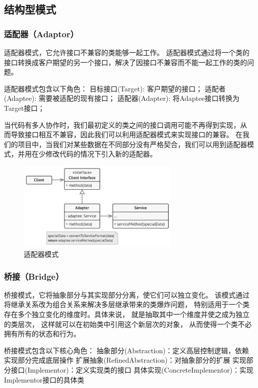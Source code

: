 \documentclass[12pt]{ctexart} %
\begin{document}
\subsection{结构型模式} 
\subsubsection{适配器（Adaptor）} 
适配器模式，它允许接口不兼容的类能够一起工作。
适配器模式通过将一个类的接口转换成客户期望的另一个接口，解决了因接口不兼容而不能一起工作的类的问题。

适配器模式包含以下角色：
目标接口(Target): 客户期望的接口；
适配者(Adaptee): 需要被适配的现有接口；
适配器(Adapter): 将Adaptee接口转换为Target接口；

当代码有多人协作时，我们最初定义的类之间的接口调用可能不再得到实现，从
⽽导致接口相互不兼容，因此我们可以利用适配器模式来实现接口的兼容。
在我们的项目中，当我们对某些数据在不同部分没有严格契合，我们可以用到适配器模
式，并用在少修改代码的情况下引入新的适配器。
\begin{figure}[H]
  \centering
  \includegraphics[width=0.7\textwidth]{shipei.png}
  \caption{适配器模式}
\end{figure}

\subsubsection{桥接（Bridge）} 
桥接模式，它将抽象部分与其实现部分分离，使它们可以独立变化。
该模式通过将继承关系改为组合关系来解决多层继承带来的类爆炸问题，
特别适用于一个类存在多个独立变化的维度时。具体来说， 
就是抽取其中一个维度并使之成为独立的类层次， 
这样就可以在初始类中引用这个新层次的对象， 从而使得一个类不必拥有所有的状态和行为。

桥接模式包含以下核心角色：
抽象部分(Abstraction)：定义高层控制逻辑，依赖实现部分完成底层操作
扩展抽象(RefinedAbstraction)：对抽象部分的扩展
实现部分接口(Implementor)：定义实现类的接口
具体实现(ConcreteImplementor)：实现Implementor接口的具体类
\end{document}
